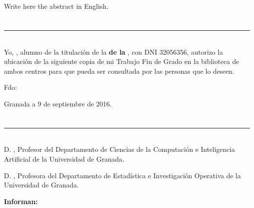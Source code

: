 \\

\vspace{0.7cm}
\\

Write here the abstract in English.

\chapter*{}
\thispagestyle{empty}

\noindent\rule[-1ex]{\textwidth}{2pt}\\[4.5ex]

Yo, \textbf{\myName}, alumno de la titulación \myDegree de la \textbf{\myFaculty de la \myUni}, con DNI 32056356, autorizo la
ubicación de la siguiente copia de mi Trabajo Fin de Grado en la biblioteca de ambos centros para que pueda ser
consultada por las personas que lo deseen.

\vspace{6cm}

\noindent Fdo: \myName

\vspace{2cm}

\begin{flushright}
Granada a 9 de septiembre de 2016.
\end{flushright}


\chapter*{}
\thispagestyle{empty}

\noindent\rule[-1ex]{\textwidth}{2pt}\\[4.5ex]

D. \textbf{ \myProf }, Profesor del Departamento de Ciencias de la Computación e Inteligencia Artificial de la Universidad de Granada.

\vspace{0.5cm}

D. \textbf{ \myOtherProf}, Profesora del Departamento de Estadística e Investigación Operativa de la Universidad de Granada.


\vspace{0.5cm}

\textbf{Informan:}


